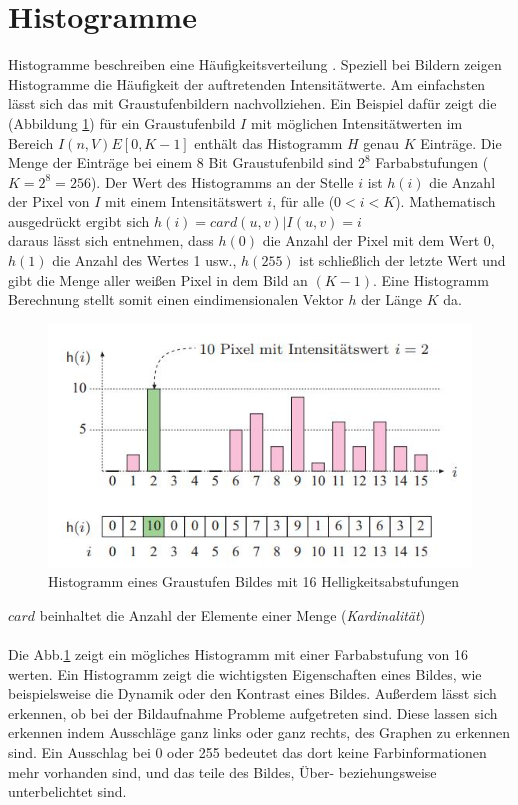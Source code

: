 \section{Histogramme}\label{s.histogramme}
Histogramme beschreiben eine Häufigkeitsverteilung \cite[42ff.]{burger2009digitale}. Speziell bei Bildern zeigen Histogramme die Häufigkeit der auftretenden Intensitätwerte. Am einfachsten lässt sich das mit Graustufenbildern nachvollziehen. Ein Beispiel dafür zeigt die (Abbildung \ref{img:histogramm}) für ein Graustufenbild $I$ mit möglichen Intensitätwerten im Bereich $I(n,V)E[0,K-1]$ enthält das Histogramm $H$ genau $K$ Einträge. Die Menge der Einträge bei einem 8 Bit Graustufenbild sind $2^8$ Farbabstufungen ($K=2^8=256$). Der Wert des Histogramms an der Stelle $i$ ist $h(i)$ die Anzahl der Pixel von $I$ mit einem Intensitätswert $i$, für alle ($0<i<K$). Mathematisch ausgedrückt ergibt sich $h(i)=card{(u,v) | I(u,v)=i}$\\
  daraus lässt sich entnehmen, dass $h(0)$ die Anzahl der Pixel mit dem Wert 0, $h(1)$ die Anzahl des Wertes 1 usw., $h(255)$ ist schließlich der letzte Wert und gibt die Menge aller weißen Pixel in dem Bild an $(K-1)$. Eine Histogramm Berechnung stellt somit einen eindimensionalen Vektor $h$ der Länge $K$ da.\\
  \begin{figure}
    [h]
    \centering
    \includegraphics[scale=1.0]{Sources/histogramm.jpg}
    \caption{Histogramm eines Graustufen Bildes mit 16 Helligkeitsabstufungen \cite[42]{burger2009digitale}}
    \label{img:histogramm}
  \end{figure}
$card$ beinhaltet die Anzahl der Elemente einer Menge (\textit{Kardinalität})\\\\
Die Abb.\ref{img:histogramm} zeigt ein mögliches Histogramm mit einer Farbabstufung von 16 werten. Ein Histogramm zeigt die wichtigsten Eigenschaften eines Bildes, wie beispielsweise die Dynamik oder den Kontrast eines Bildes. Außerdem lässt sich erkennen, ob bei der Bildaufnahme Probleme aufgetreten sind. Diese lassen sich erkennen indem Ausschläge ganz links oder ganz rechts, des Graphen zu erkennen sind. Ein Ausschlag bei 0 oder 255 bedeutet das dort keine Farbinformationen mehr vorhanden sind, und das teile des Bildes, Über- beziehungsweise unterbelichtet sind.\\\\
